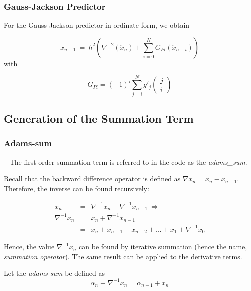 \subsubsection{Gauss-Jackson Predictor}
For the Gauss-Jackson predictor in ordinate form, we obtain

\begin{equation} \label{eq:gj_pred_form}
x_{n+1}\ =\ h^{2}\left(\nabla ^{-2}({\ddot{x}}_{n})+\sum
_{i=0}^{N}G_{Pi}({\ddot{x}}_{n-i})\right) 
\end{equation}
with 

\begin{equation} \label{eq:G_Pi}
G_{Pi}=(-1)^{i}\sum
_{j=i}^{N}g'_{j}\left(\begin{matrix}j\\i\end{matrix}\right)
\end{equation}



\subsection{Generation of the Summation Term}\label{sec:summation_term}

\subsubsection{Adams-sum} \ \newline
The first order summation term is referred to in the code as the
\textit{adams\_sum}.

Recall that the backward difference operator is defined as 
$\nabla  x_{n}=x_{n}-x_{n-1}$. Therefore, the inverse can be found
recursively:

\begin{eqnarray*}
x_{n} & = & \nabla ^{-1}x_{n}-\nabla ^{-1}x_{n-1}\ \Rightarrow \\
\nabla ^{-1}x_{n} & = & x_{n}+\nabla ^{-1}x_{n-1} \\ 
& = & x_{n}+x_{n-1}+x_{n-2}+...+x_{1}+\nabla ^{-1}x_{0}
\end{eqnarray*}

Hence, the value  $\nabla ^{-1}{{x}}_{n}$ can be found
by iterative summation (hence the name, \textit{summation operator}).
The same result can be applied to the derivative terms.

Let the \textit{adams-sum} be defined as
\begin{equation}
\alpha_{n} \equiv \nabla ^{-1}\ddot{x}_{n}=\alpha_{n-1}+\ddot{x}_{n}
\end{equation}


